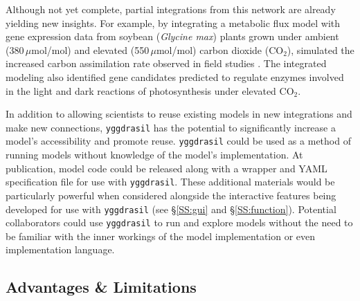 \documentclass[journal]{IEEEtran}
\newcommand{\pkg}{{\tt yggdrasil}{}}
\begin{document}
Although not yet complete, partial integrations from this network are already yielding new insights. For example, by integrating a metabolic flux model  with gene expression data from soybean (\emph{Glycine max}) plants grown under ambient (380\,$\mu$mol/mol) and elevated (550\,$\mu$mol/mol) carbon dioxide (CO$_2$), 
%
\ifieee
	\citep{integration_prep} 
\else
	\citet{integration_prep} 
\fi
%
simulated the increased carbon assimilation rate observed in field studies \citep{Bernacchi2005}. The integrated modeling also identified gene candidates predicted to regulate enzymes involved in the light and dark reactions of photosynthesis under elevated CO$_2$.

In addition to allowing scientists to reuse existing models in new integrations and make new connections, {\pkg} has the potential to significantly increase a model's accessibility and promote reuse. {\pkg} could be used as a method of running models without knowledge of the model's implementation. At publication, model code could be released along with a wrapper and YAML specification file for use with {\pkg}. These additional materials would be particularly powerful when considered alongside the interactive features being developed for use with {\pkg} (see \S\ref{SS:gui} and \S\ref{SS:function}). Potential collaborators could use {\pkg} to run and explore models without the need to be familiar with the inner workings of the model implementation or even implementation language.

%
\subsection{Advantages \& Limitations}\label{SS:uses}
%
\end{document}
